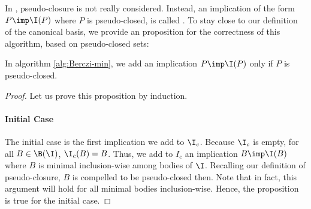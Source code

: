 \noindent In \cite{berczi_directed_2017, boros_strong_2017}, pseudo-closure
is not really considered. Instead, an implication of the form $P \imp \I(P)$ 
where $P$ is pseudo-closed, is called . To stay
close to our definition of the canonical basis, we provide an proposition for 
the correctness of this algorithm, based on pseudo-closed sets:

\begin{proposition} In algorithm \ref{alg:Berczi-min}, we add an implication
	$P \imp \I(P)$ only if $P$ is pseudo-closed.
	
\end{proposition}

\begin{proof} Let us prove this proposition by induction. 
	
	\paragraph{Initial Case} The initial case is the first implication we add
	to $\I_c$. Because $\I_c$ is empty, for all $B \in \B(\I)$, $\I_c(B) = B$.
	Thus, we add to $I_c$ an implication $B \imp \I(B)$ where $B$ is minimal
	inclusion-wise among bodies of $\I$. Recalling our definition of 
	pseudo-closure, $B$ is compelled to be pseudo-closed then. Note that in 
	fact,
	this argument will hold for all minimal bodies inclusion-wise. Hence, the 
	proposition is true for the initial case.
	
	\vspace{0.5em}
	

\end{proof}
